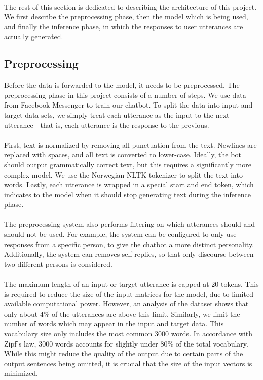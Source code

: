 \documentclass{article}
\begin{document}
\paragraph{}
The rest of this section is dedicated to describing the architecture of
this project. We first describe the preprocessing phase, then the model which
is being used, and finally the inference phase, in which the responses to user
utterances are actually generated.

\subsection*{Preprocessing}
Before the data is forwarded to the model, it needs to be preprocessed. The
preprocessing phase in this project consists of a number of steps. We use
data from Facebook Messenger to train our chatbot. To split the data into
input and target data sets, we simply treat each utterance as the input to
the next utterance - that is, each utterance is the response to the previous.

\paragraph{}
First, text is normalized by removing all punctuation from the text. Newlines
are replaced with spaces, and all text is converted to lower-case. Ideally,
the bot should output grammatically correct text, but this requires a
significantly more complex model. We use the Norwegian NLTK tokenizer to split
the text into words. Lastly, each utterance is wrapped in a special start and
end token, which indicates to the model when it should stop generating text
during the inference phase.

\paragraph{}
The preprocessing system also performs filtering on which utterances should
and should not be used. For example, the system can be configured to only
use responses from a specific person, to give the chatbot a more distinct
personality. Additionally, the system can removes self-replies, so that
only discourse between two different persons is considered.

\paragraph{}
The maximum length of an input or target utterance is capped at 20 tokens.
This is required to reduce the size of the input matrices for the model, due
to limited available computational power. However, an analysis of the dataset
shows that only about 4\% of the utterances are above this limit. Similarly,
we limit the number of words which may appear in the input and target data.
This vocabulary size only includes the most common 3000 words. In accordance
with Zipf's law, 3000 words accounts for slightly under 80\% of the total
vocabulary. While this might reduce the quality of the output due to certain
parts of the output sentences being omitted, it is crucial that the size of
the input vectors is minimized.
\end{document}
